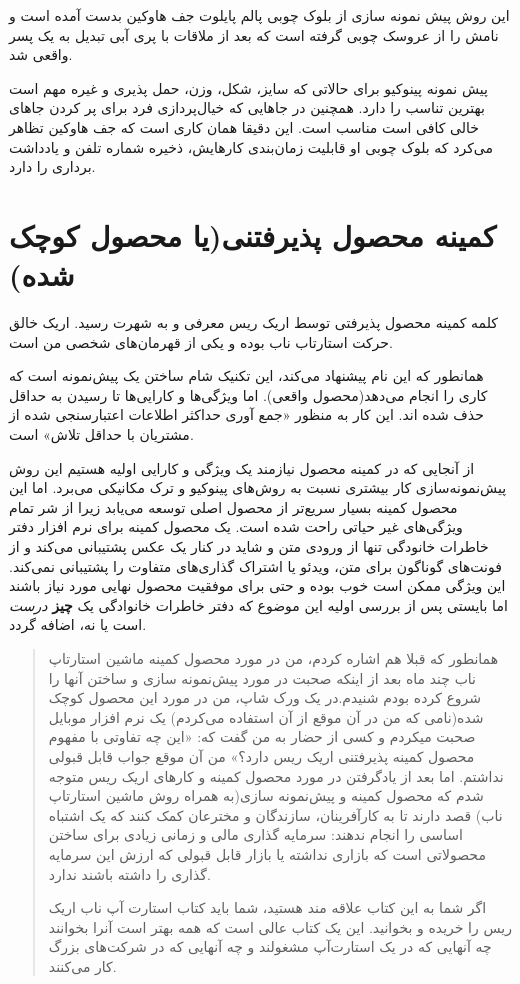 این روش پیش نمونه سازی از بلوک چوبی پالم پایلوت جف هاوکین بدست آمده است
و نامش را از عروسک چوبی گرفته است که بعد از ملاقات با پری آبی تبدیل به
یک پسر واقعی شد.

پیش نمونه پینوکیو برای حالاتی که سایز، شکل، وزن، حمل پذیری و غیره مهم
است بهترین تناسب را دارد. همچنین در جاهایی که خیال‌پردازی فرد برای پر
کردن جاهای خالی کافی است مناسب است. این دقیقا همان کاری است که جف هاوکین
تظاهر می‌کرد که بلوک چوبی او قابلیت زمان‌بندی کارهایش، ذخیره شماره تلفن
و یادداشت برداری را دارد.

\section{کمینه محصول پذیرفتنی(یا محصول کوچک
شده)}\label{ux6a9ux645ux6ccux646ux647-ux645ux62dux635ux648ux644-ux67eux630ux6ccux631ux641ux62aux646ux6ccux6ccux627-ux645ux62dux635ux648ux644-ux6a9ux648ux686ux6a9-ux634ux62fux647}

کلمه کمینه محصول پذیرفتی توسط اریک ریس معرفی و به شهرت رسید. اریک خالق
حرکت استارتاب ناب بوده و یکی از قهرمان‌های شخصی من است.

همانطور که این نام پیشنهاد می‌کند، این تکنیک شام ساختن یک پیش‌نمونه‌ است
که کاری را انجام می‌دهد(محصول واقعی). اما ویژگی‌ها و کارایی‌ها تا رسیدن
به حداقل حذف شده اند. این کار به منظور «جمع آوری حداکثر اطلاعات
اعتبارسنجی شده از مشتریان با حداقل تلاش» است.

از آنجایی که در کمینه محصول نیازمند یک ویژگی و کارایی اولیه هستیم این
روش پیش‌نمونه‌سازی کار بیشتری نسبت به روش‌های پینوکیو و ترک مکانیکی
می‌برد. اما این محصول کمینه بسیار سریع‌تر از محصول اصلی توسعه می‌یابد
زیرا از شر تمام ویژگی‌های غیر حیاتی راحت شده است. یک محصول کمینه برای
نرم افزار دفتر خاطرات خانودگی تنها از ورودی متن و شاید در کنار یک عکس
پشتیبانی می‌کند و از فونت‌های گوناگون برای متن، ویدئو یا اشتراک
گذاری‌های متفاوت را پشتیبانی نمی‌کند. این ویژگی ممکن است خوب بوده و حتی
برای موفقیت محصول نهایی مورد نیاز باشند اما بایستی پس از بررسی اولیه این
موضوع که دفتر خاطرات خانوادگی یک \textbf{چیز} \emph{درست} است یا نه،
اضافه گردد.

\begin{quote}
همانطور که قبلا هم اشاره کردم، من در مورد محصول کمینه ماشین استارتاپ ناب
چند ماه بعد از اینکه صحبت در مورد پیش‌نمونه سازی و ساختن آنها را شروع
کرده بودم شنیدم.در یک ورک شاپ، من در مورد این محصول کوچک شده(نامی که من
در آن موقع از آن استفاده می‌کردم) یک نرم افزار موبایل صحبت میکردم و کسی
از حضار به من گفت که: «این چه تفاوتی با مفهوم محصول کمینه پذیرفتنی اریک
ریس دارد؟» من آن موقع جواب قابل قبولی نداشتم. اما بعد از یادگرفتن در
مورد محصول کمینه و کارهای اریک ریس متوجه شدم که محصول کمینه و پیش‌نمونه
سازی(به همراه روش ماشین استارتاپ ناب) قصد دارند تا به کارآفرینان،
سازندگان و مخترعان کمک کنند که یک اشتباه اساسی را انجام ندهند: سرمایه
گذاری مالی و زمانی زیادی برای ساختن محصولاتی است که بازاری نداشته یا
بازار قابل قبولی که ارزش این سرمایه گذاری را داشته باشند ندارد.

اگر شما به این کتاب علاقه مند هستید، شما باید کتاب استارت آپ ناب اریک
ریس را خریده و بخوانید. این یک کتاب عالی است که همه بهتر است آنرا
بخوانند چه آنهایی که در یک استارت‌آپ مشغولند و چه آنهایی که در شرکت‌های
بزرگ کار می‌کنند.
\end{quote}

